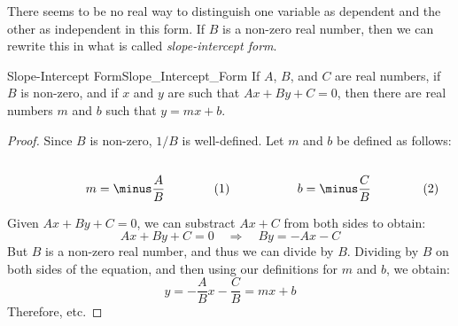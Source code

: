 \documentclass[crop=false,class=book,oneside]{standalone}                      %
\begin{document}
            There seems to be no real way to distinguish one variable as
            dependent and the other as independent in this form. If $B$ is a
            non-zero real number, then we can rewrite this in what is called
            \textit{slope-intercept form}.
            \newpage
            \begin{ltheorem}{Slope-Intercept Form}{Slope_Intercept_Form}
                If $A$, $B$, and $C$ are real numbers, if $B$ is non-zero, and
                if $x$ and $y$ are such that $Ax+By+C=0$, then there are real
                numbers $m$ and $b$ such that $y=mx+b$.
            \end{ltheorem}
            \begin{proof}
                Since $B$ is non-zero, $1/B$ is well-defined.
                Let $m$ and $b$ be defined as follows:
                \par
                \begin{subequations}
                    \begin{minipage}[b]{0.49\textwidth}
                        \centering
                        \begin{equation}
                            m=\minus\frac{A}{B}
                        \end{equation}
                    \end{minipage}
                    \hfill
                    \begin{minipage}[b]{0.49\textwidth}
                        \centering
                        \begin{equation}
                            b=\minus\frac{C}{B}
                        \end{equation}
                    \end{minipage}
                \end{subequations}
                \par\vspace{2.5ex}
                Given $Ax+By+C=0$, we can substract $Ax+C$ from both sides
                to obtain:
                \begin{equation}
                    Ax+By+C=0
                    \quad\Longrightarrow\quad
                    By=\minus{A}x-C
                \end{equation}
                But $B$ is a non-zero real number, and thus we can divide by
                $B$. Dividing by $B$ on both sides of the equation, and then
                using our definitions for $m$ and $b$, we obtain:
                \begin{equation}
                    y=\minus\frac{A}{B}x-\frac{C}{B}
                     =mx+b
                \end{equation}
                Therefore, etc.
            \end{proof}
\end{document}
